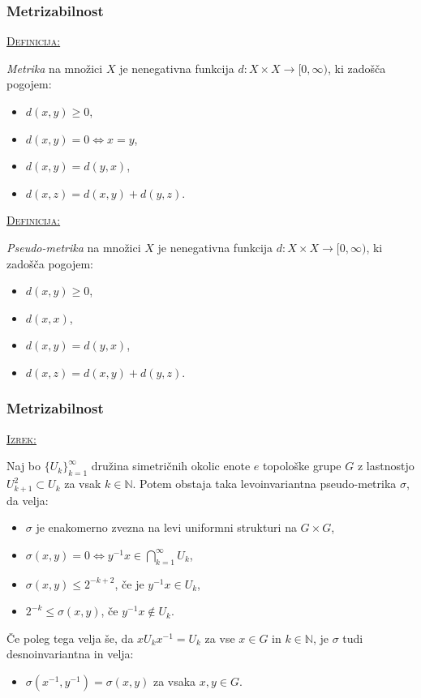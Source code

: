 \documentclass[a4paper, 12pt]{beamer}
\newenvironment{matematika}[1]{
\textcolor{bostonuniversityred}{\underline{\textsc{#1:}}}
}{
}
\begin{document}
\begin{frame}
\frametitle{Metrizabilnost}
\begin{matematika}{Definicija}
\emph{Metrika} na množici $X$ je nenegativna funkcija $d: X \times X \to [0,\infty)$, ki zadošča pogojem:
\begin{itemize}[label=]
\item $d(x, y) \geq 0$,
\item $d(x, y) = 0 \iff x = y$,
\item $d(x, y) = d(y, x)$,
\item $d(x, z) = d(x, y) + d(y, z)$.
\end{itemize}
\end{matematika}

\pause

\begin{matematika}{Definicija}
\emph{Pseudo-metrika} na množici $X$ je nenegativna funkcija $d: X \times X \to [0,\infty)$, ki zadošča pogojem:
\begin{itemize}[label=]
\item $d(x, y) \geq 0$,
\item $d(x, x)$,
\item $d(x, y) = d(y, x)$,
\item $d(x, z) = d(x, y) + d(y, z)$.
\end{itemize}
\end{matematika}
\end{frame}

\begin{frame}
\frametitle{Metrizabilnost}
\begin{matematika}{Izrek}
Naj bo $\{ U_k \}_{k=1}^{\infty}$ družina simetričnih okolic enote $e$ topološke grupe $G$ z lastnostjo $U_{k+1}^2 \subset U_k$ za vsak $k\in\mathbb{N}$. Potem obstaja taka levoinvariantna pseudo-metrika $\sigma$, da velja:
\begin{itemize}[label=]
\item $\sigma$ je enakomerno zvezna na levi uniformni strukturi na $G \times G$,
\item $\sigma (x, y) = 0 \iff y^{-1}x \in \bigcap_{k=1}^{\infty}U_k$,
\item $\sigma (x, y) \leq 2^{-k+2}$, če je $y^{-1}x \in U_k$,
\item $2^{-k} \leq \sigma (x, y)$, če $y^{-1}x \notin U_k$.
\end{itemize}
Če poleg tega velja še, da $x U_k x^{-1} = U_k$ za vse $x \in G$ in $k\in\mathbb{N}$, je $\sigma$ tudi desnoinvariantna in velja:
\begin{itemize}[label=]
\item $\sigma (x^{-1}, y^{-1}) = \sigma (x, y)$ za vsaka $x, y \in G$.
\end{itemize}
\end{matematika}
\end{frame}
\end{document}
